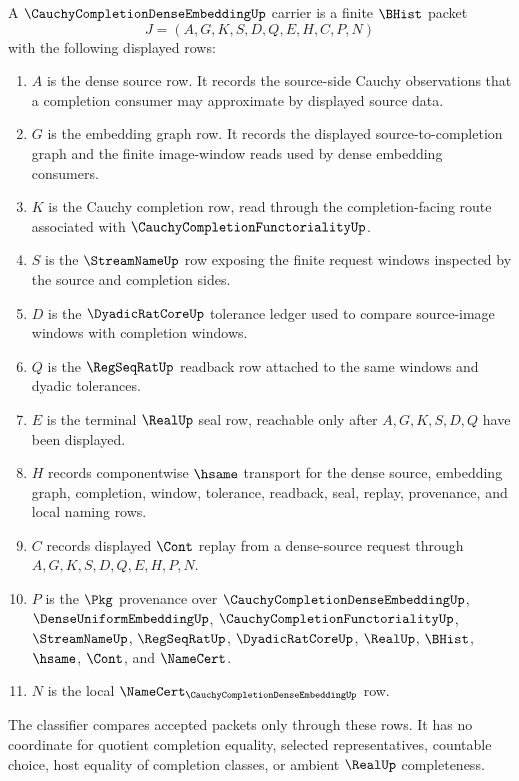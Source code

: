 \begin{definition}
\label{def:cauchy-completion-dense-embedding-carrier}
A $\CauchyCompletionDenseEmbeddingUp$ carrier is a finite $\BHist$ packet
$$
J=(A,G,K,S,D,Q,E,H,C,P,N)
$$
with the following displayed rows:
\begin{enumerate}
\item $A$ is the dense source row. It records the source-side Cauchy observations that a completion consumer may approximate by displayed source data.
\item $G$ is the embedding graph row. It records the displayed source-to-completion graph and the finite image-window reads used by dense embedding consumers.
\item $K$ is the Cauchy completion row, read through the completion-facing route associated with $\CauchyCompletionFunctorialityUp$.
\item $S$ is the $\StreamNameUp$ row exposing the finite request windows inspected by the source and completion sides.
\item $D$ is the $\DyadicRatCoreUp$ tolerance ledger used to compare source-image windows with completion windows.
\item $Q$ is the $\RegSeqRatUp$ readback row attached to the same windows and dyadic tolerances.
\item $E$ is the terminal $\RealUp$ seal row, reachable only after $A,G,K,S,D,Q$ have been displayed.
\item $H$ records componentwise $\hsame$ transport for the dense source, embedding graph, completion, window, tolerance, readback, seal, replay, provenance, and local naming rows.
\item $C$ records displayed $\Cont$ replay from a dense-source request through $A,G,K,S,D,Q,E,H,P,N$.
\item $P$ is the $\Pkg$ provenance over $\CauchyCompletionDenseEmbeddingUp$, $\DenseUniformEmbeddingUp$, $\CauchyCompletionFunctorialityUp$, $\StreamNameUp$, $\RegSeqRatUp$, $\DyadicRatCoreUp$, $\RealUp$, $\BHist$, $\hsame$, $\Cont$, and $\NameCert$.
\item $N$ is the local $\NameCert_{\CauchyCompletionDenseEmbeddingUp}$ row.
\end{enumerate}
The classifier compares accepted packets only through these rows. It has no coordinate for quotient completion equality, selected representatives, countable choice, host equality of completion classes, or ambient $\RealUp$ completeness.
\end{definition}

